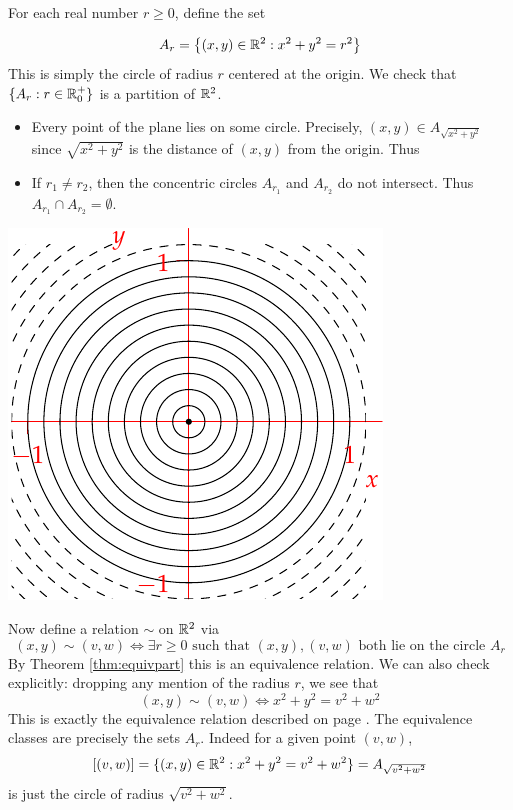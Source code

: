 \begin{example}{}{}
	For each real number $r\ge 0$, define the set\par
	\begin{minipage}[t]{0.63\linewidth}\vspace{0pt}
		\[
			A_r=\bigl\{(x,y)\in\mathbb{R}^2:x^2+y^2=r^2\bigr\}
		\]
		This is simply the circle of radius $r$ centered at the origin. We check that $\{A_r:r\in\mathbb{R}^+_0\}$ is a partition of $\mathbb{R}^2$.
		\begin{itemize}
	 		\item Every point of the plane lies on some circle. Precisely, $(x,y)\in A_{\sqrt{x^2+y^2}}$ since $\sqrt{x^2+y^2}$ is the distance of $(x,y)$ from the origin. Thus 
	  	\item If $r_1\neq r_2$, then the concentric circles $A_{r_1}$ and $A_{r_2}$ do not intersect. Thus $A_{r_1}\cap A_{r_2}=\emptyset$.
		\end{itemize}
	\end{minipage}
	\hfill
	\begin{minipage}[t]{0.32\linewidth}\vspace{0pt}
		\includegraphics[width=\textwidth]{relations-09-circles}
	\end{minipage}\par

	Now define a relation $\sim$ on $\mathbb{R}^2$ via
	\[
		(x,y)\sim(v,w)\iff \exists r\ge 0\text{ such that $(x,y),(v,w)$ both lie on the circle $A_r$}
	\]
	By Theorem \ref{thm:equivpart} this is an equivalence relation. We can also check explicitly: dropping any mention of the radius $r$, we see that
	\[
		(x,y)\sim(v,w)\iff x^2+y^2=v^2+w^2
	\]
	This is exactly the equivalence relation described on page \pageref{ex:equivcircle}. The equivalence classes are precisely the sets $A_r$. Indeed for a given point $(v,w)$,
	\[
		[(v,w)]=\{(x,y)\in\mathbb{R}^2:x^2+y^2=v^2+w^2\}=A_{\sqrt{v^2+w^2}}
	\]
	is just the circle of radius $\sqrt{v^2+w^2}$.
\end{example}


